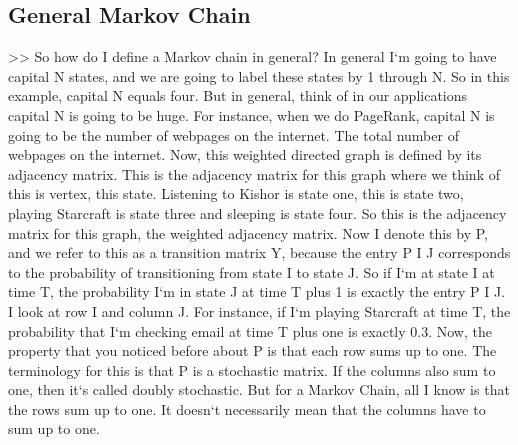 \subsection{General Markov Chain}
\textgreater{}\textgreater{} So how do I define a Markov chain in general? In general I`m going to have capital N states, and we are going to label these states by 1 through N\@.
So in this example, capital N equals four.
But in general, think of in our applications capital N is going to be huge.
For instance, when we do PageRank, capital N is going to be the number of webpages on the internet.
The total number of webpages on the internet.
Now, this weighted directed graph is defined by its adjacency matrix.
This is the adjacency matrix for this graph where we think of this is vertex, this state.
Listening to Kishor is state one, this is state two, playing Starcraft is state three and sleeping is state four.
So this is the adjacency matrix for this graph, the weighted adjacency matrix.
Now I denote this by P, and we refer to this as a transition matrix Y, because the entry P I J corresponds to the probability of transitioning from state I to state J\@.
So if I`m at state I at time T, the probability I`m in state J at time T plus 1 is exactly the entry P I J\@.
I look at row I and column J\@.
For instance, if I`m playing Starcraft at time T, the probability that I`m checking email at time T plus one is exactly 0.3.
Now, the property that you noticed before about P is that each row sums up to one.
The terminology for this is that P is a stochastic matrix.
If the columns also sum to one, then it`s called doubly stochastic.
But for a Markov Chain, all I know is that the rows sum up to one.
It doesn`t necessarily mean that the columns have to sum up to one.

